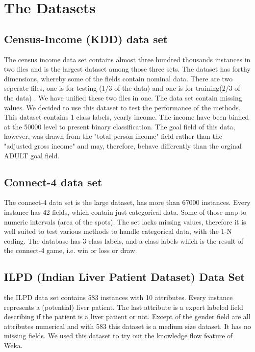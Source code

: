 \documentclass[a4paper]{article}
\begin{document}
\section{The Datasets}
\subsection{Census-Income (KDD)  data set}
The census income data set contains almost three hundred thousands instances in
two files and is the largest dataset among those three sets. The dataset has
forthy dimensions, whereby some of the fields contain nominal data. There are
two seperate files, one is for testing (1/3 of the data) and one is for
training(2/3 of the data) . We have unified these two files in one. The data set
contain missing values. We decided to use this dataset to test the performance
of the methods. This dataset contains 1 class labels, yearly income. The income
have been binned at the 50000 level to present binary classification. The goal
field of this data, however, was drawn from the "total person income" field
rather than the "adjusted gross income" and may, therefore, behave differently
than the orginal ADULT goal field.

\subsection{Connect-4 data set}
The connect-4 data set is the large dataset, has more than 67000 instances.
Every instance has 42 fields, which contain just categorical data. Some of those
map to numeric intervals
(area of the spots). The set lacks missing values, therefore it is well suited
to test various methods to handle categorical data, with the 1-N coding. The
database has 3 class labels, and a class labels which
is the result of the connect-4 game, i.e. win or loss or draw.

\subsection{ILPD (Indian Liver Patient Dataset) Data Set}
the ILPD data set contains 583 instances with 10 attributes. Every instance
represents a (potential) liver patient. The last attribute is a expert labeled
field describing if the patient is 
a liver patient or not. Except of the gender field are all attributes numerical
and with 583 this dataset is a medium size dataset. It has no missing fields. 
We used this dataset to try out the knowledge flow feature of Weka.
\end{document}

